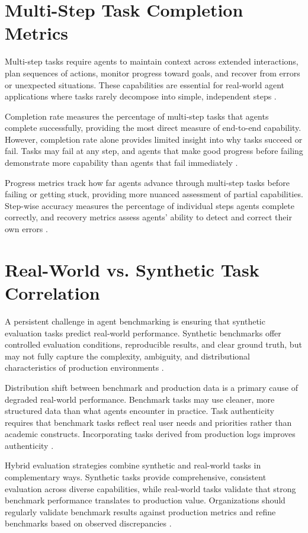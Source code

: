\begin{TNtwocol}
\section{Multi-Step Task Completion Metrics}
Multi-step tasks require agents to maintain context across extended interactions, plan sequences of actions, monitor progress toward goals, and recover from errors or unexpected situations. These capabilities are essential for real-world agent applications where tasks rarely decompose into simple, independent steps \cite{zhou2023,deng2023}.

Completion rate measures the percentage of multi-step tasks that agents complete successfully, providing the most direct measure of end-to-end capability. However, completion rate alone provides limited insight into why tasks succeed or fail. Tasks may fail at any step, and agents that make good progress before failing demonstrate more capability than agents that fail immediately \cite{zhou2023}.

Progress metrics track how far agents advance through multi-step tasks before failing or getting stuck, providing more nuanced assessment of partial capabilities. Step-wise accuracy measures the percentage of individual steps agents complete correctly, and recovery metrics assess agents' ability to detect and correct their own errors \cite{zhou2023,deng2023}.

\section{Real-World vs. Synthetic Task Correlation}
A persistent challenge in agent benchmarking is ensuring that synthetic evaluation tasks predict real-world performance. Synthetic benchmarks offer controlled evaluation conditions, reproducible results, and clear ground truth, but may not fully capture the complexity, ambiguity, and distributional characteristics of production environments \cite{recht2019,kiela2021,getmaximai2024}.

Distribution shift between benchmark and production data is a primary cause of degraded real-world performance. Benchmark tasks may use cleaner, more structured data than what agents encounter in practice. Task authenticity requires that benchmark tasks reflect real user needs and priorities rather than academic constructs. Incorporating tasks derived from production logs improves authenticity \cite{googlecloud2024,getmaximai2024}.

Hybrid evaluation strategies combine synthetic and real-world tasks in complementary ways. Synthetic tasks provide comprehensive, consistent evaluation across diverse capabilities, while real-world tasks validate that strong benchmark performance translates to production value. Organizations should regularly validate benchmark results against production metrics and refine benchmarks based on observed discrepancies \cite{liu2023,googlecloud2024}.
\end{TNtwocol}
